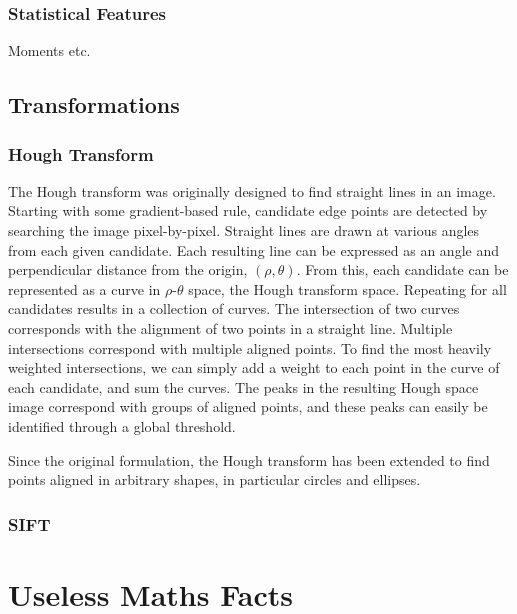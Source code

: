 \documentclass[11pt]{amsart}
\begin{document}
\subsubsection{Statistical Features}

Moments etc.

\subsection{Transformations}

\subsubsection{Hough Transform}

The Hough transform was originally designed to find straight lines in an image. Starting with some gradient-based rule, candidate edge points are detected by searching the image pixel-by-pixel. Straight lines are drawn at various angles from each given candidate. Each resulting line can be expressed as an angle and perpendicular distance from the origin, $(\rho, \theta)$. From this, each candidate can be represented as a curve in $\rho$-$\theta$ space, the Hough transform space. Repeating for all candidates results in a collection of curves. The intersection of two curves corresponds with the alignment of two points in a straight line. Multiple intersections correspond with multiple aligned points. To find the most heavily weighted intersections, we can simply add a weight to each point in the curve of each candidate, and sum the curves. The peaks in the resulting Hough space image correspond with groups of aligned points, and these peaks can easily be identified through a global threshold.


Since the original formulation, the Hough transform has been extended to find points aligned in arbitrary shapes, in particular circles and ellipses.

\subsubsection{SIFT}

\section{Useless Maths Facts}
\end{document}
